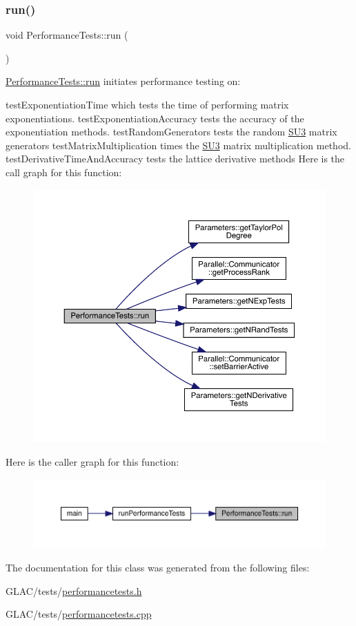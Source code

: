 \subsubsection{\texorpdfstring{run()}{run()}}
{\footnotesize\ttfamily void Performance\+Tests\+::run (\begin{DoxyParamCaption}{ }\end{DoxyParamCaption})}



\mbox{\hyperlink{class_performance_tests_aa55ebdbc84db93cc45adfdf7163f90b4}{Performance\+Tests\+::run}} initiates performance testing on\+: 

test\+Exponentiation\+Time which tests the time of performing matrix exponentiations. test\+Exponentiation\+Accuracy tests the accuracy of the exponentiation methods. test\+Random\+Generators tests the random \mbox{\hyperlink{class_s_u3}{S\+U3}} matrix generators test\+Matrix\+Multiplication times the \mbox{\hyperlink{class_s_u3}{S\+U3}} matrix multiplication method. test\+Derivative\+Time\+And\+Accuracy tests the lattice derivative methods Here is the call graph for this function\+:\nopagebreak
\begin{figure}[H]
\begin{center}
\leavevmode
\includegraphics[width=350pt]{class_performance_tests_aa55ebdbc84db93cc45adfdf7163f90b4_cgraph}
\end{center}
\end{figure}
Here is the caller graph for this function\+:\nopagebreak
\begin{figure}[H]
\begin{center}
\leavevmode
\includegraphics[width=350pt]{class_performance_tests_aa55ebdbc84db93cc45adfdf7163f90b4_icgraph}
\end{center}
\end{figure}


The documentation for this class was generated from the following files\+:\begin{DoxyCompactItemize}
\item 
G\+L\+A\+C/tests/\mbox{\hyperlink{performancetests_8h}{performancetests.\+h}}\item 
G\+L\+A\+C/tests/\mbox{\hyperlink{performancetests_8cpp}{performancetests.\+cpp}}\end{DoxyCompactItemize}
